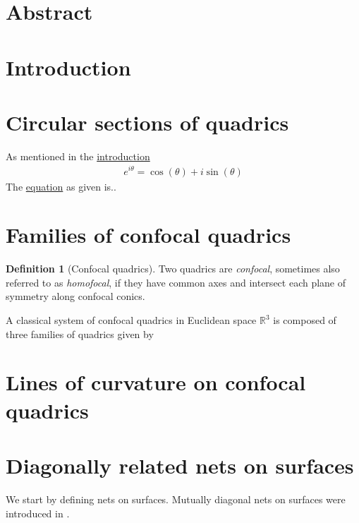 \documentclass[12pt,a4paper]{article}
\theoremstyle{definition}
\newtheorem{definition}{Definition}[section]
\theoremstyle{remark}
\theoremstyle{definition}
\begin{document}
\pagestyle{fancy}
\section*{Abstract} \label{sec:abstract}
\pagebreak
\pagestyle{tocstyle}
\renewcommand{\contentsname}{Contents}
\tableofcontents
\pagebreak
\listoffigures
\pagebreak
\pagestyle{fancy}
\section{Introduction} \label{sec:introduction}
\pagebreak
\section{Circular sections of quadrics}
As mentioned in the \hyperref[sec:introduction]{introduction}
\begin{align} \label{eq:Euler}
    e^{i \theta} = \cos(\theta)+i\sin(\theta)
\end{align}
The \hyperref[eq:Euler]{equation} as given is..
\pagebreak
\section{Families of confocal quadrics}
\begin{definition}[Confocal quadrics]
\label{def:confocal-quadrics}
Two quadrics are \textit{confocal}, sometimes also referred to as \textit{homofocal}, if they have common axes and intersect each plane of symmetry along confocal conics.
\end{definition}
A classical system of confocal quadrics in Euclidean space $\mathbb{R}^3$ is composed of three families of quadrics given by
\pagebreak
\section{Lines of curvature on confocal quadrics}
\pagebreak
\section{Diagonally related nets on surfaces}
We start by defining nets on surfaces. Mutually diagonal nets on surfaces were introduced in \cite{MutuallyDiagonalNets2019}.
\end{document}
